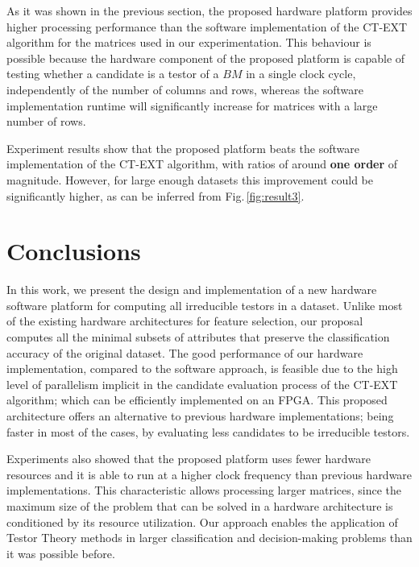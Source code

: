 \documentclass[authoryear,preprint,review,12pt]{elsarticle}
\begin{document}

As it was shown in the previous section, the proposed hardware platform provides higher processing
performance than the software implementation of the CT-EXT
algorithm for the matrices used in our experimentation. 
This behaviour is possible because the hardware
component of the proposed platform is capable of testing whether a 
candidate is a testor of a $BM$ in a single clock cycle,
independently of the number of columns and rows, whereas
the software implementation runtime will significantly
increase for matrices with a large number of rows.

Experiment results show that the proposed platform beats the software implementation of
the CT-EXT algorithm, with ratios of around \textbf{one order} of magnitude. However, for large 
enough datasets this improvement could be significantly higher, as can be inferred from 
Fig.\,\ref{fig:result3}.

\section{Conclusions}
\label{sect:8}
In this work, we present the design and implementation of a new hardware software platform for
computing all irreducible testors in a dataset.  Unlike most of the existing hardware 
architectures for feature selection, our proposal computes all the
minimal subsets of attributes that preserve the classification accuracy of the original dataset.
The good performance of our hardware implementation, compared to the software approach, is 
feasible due to the high level of parallelism implicit in the candidate evaluation process of 
the CT-EXT algorithm; which can be efficiently implemented on an FPGA. 
This proposed architecture offers an alternative to previous hardware implementations; being 
faster in most of the cases, by evaluating less candidates to be irreducible testors. 

Experiments also showed that the proposed platform uses fewer hardware resources and it is able to 
run at a higher clock frequency than previous hardware implementations. This characteristic allows 
processing larger matrices, since the maximum size of the problem that can be solved in a hardware 
architecture is conditioned by its resource utilization. 
Our approach enables the application of Testor Theory methods in larger classification and 
decision-making problems than it was possible before. 
\end{document}
